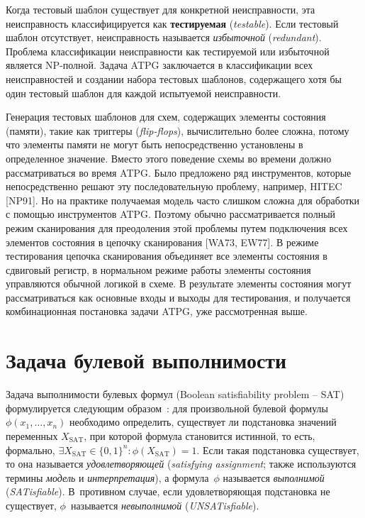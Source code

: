 Когда тестовый шаблон существует для конкретной неисправности, эта неисправность классифицируется как \textbf{тестируемая} (\textit{testable}).
Если тестовый шаблон отсутствует, неисправность называется \textit{избыточной} (\textit{redundant}).
Проблема классификации неисправности как тестируемой или избыточной является NP-полной.
Задача ATPG заключается в классификации всех неисправностей и создании набора тестовых шаблонов, содержащего хотя бы один тестовый шаблон для каждой испытуемой неисправности.

Генерация тестовых шаблонов для схем, содержащих элементы состояния (памяти), такие как триггеры (\textit{flip-flops}), вычислительно более сложна, потому что элементы памяти не могут быть непосредственно установлены в определенное значение.
Вместо этого поведение схемы во времени должно рассматриваться во время ATPG.
Было предложено ряд инструментов, которые непосредственно решают эту последовательную проблему, например, HITEC [NP91].
Но на практике получаемая модель часто слишком сложна для обработки с помощью инструментов ATPG.
Поэтому обычно рассматривается полный режим сканирования для преодоления этой проблемы путем подключения всех элементов состояния в цепочку сканирования [WA73, EW77].
В режиме тестирования цепочка сканирования объединяет все элементы состояния в сдвиговый регистр, в нормальном режиме работы элементы состояния управляются обычной логикой в схеме.
В результате элементы состояния могут рассматриваться как основные входы и выходы для тестирования, и получается комбинационная постановка задачи ATPG, уже рассмотренная выше.


\section{Задача булевой выполнимости}
\label{sec:sat}

Задача выполнимости булевых формул (Boolean satisfiability problem \--- SAT) формулируется следующим образом~\cite{handbook-sat}: для произвольной булевой формулы~$\phi(x_1, \dotsc, x_n)$ необходимо определить, существует ли подстановка значений переменных $X_\text{SAT}$, при которой формула становится истинной, то есть, формально, $\exists X_\text{SAT} \in \{0,1\}^n : \phi(X_\text{SAT}) = 1$.
Если такая подстановка существует, то она называется \textit{удовлетворяющей} (\textit{satisfying assignment}; также используются термины \textit{модель} и \textit{интерпретация}), а формула~$\phi$ называется \textit{выполнимой} (\textit{SATisfiable}).
В~противном случае, если удовлетворяющая подстановка не существует, $\phi$~называется \textit{невыполнимой} (\textit{UNSATisfiable}).

